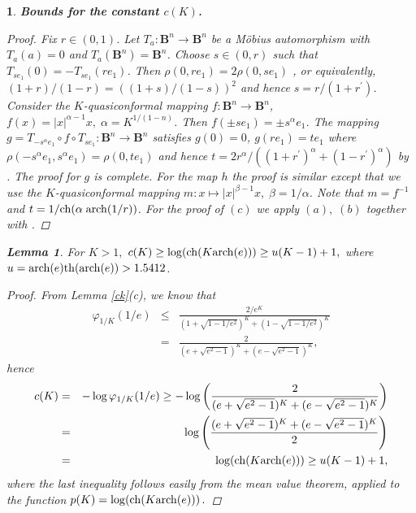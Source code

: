 \documentclass[12pt,a4paper,leqno]{amsart}
\theoremstyle{plain}
\newtheorem{lemma}[equation]{Lemma}
\newtheorem{subsec}[equation]{}
\numberwithin{equation}{section}          %
\begin{document}
\begin{subsec}{\bf Bounds for the constant $c(K)$.}
\begin{proof} Fix $r\in(0,1)$. Let $T_a:\mathbf{B}^n\to \mathbf{B}^n$ be a
M\"obius automorphism with $T_a(a)=0$ and $T_a(\mathbf{B}^n)=\mathbf{B}^n$.
Choose $s\in(0,r)$ such that $T_{se_1}(0)=-T_{se_1}(re_1)$.
Then $\rho(0,re_1)=2\rho(0,se_1)$ \cite[(2.17)]{vuobook}, or equivalently, $(1+r)/(1-r)=((1+s)/(1-s))^2$
and hence $s=r/(1+r^{'})$. Consider the $K$-quasiconformal mapping $f:\mathbf{B}^n\to \mathbf{B}^n$,
$f(x)=|x|^{\alpha-1}x,\;\alpha=K^{1/(1-n)}$. Then $f(\pm se_1)=\pm s^\alpha e_1$. The mapping
$g=T_{-s^\alpha e_1}\circ f\circ T_{se_1}:\mathbf{B}^n\to \mathbf{B}^n$ satisfies
$g(0)=0$, $g(re_1)=te_1$ where $\rho(-s^\alpha e_1,s^\alpha e_1)=\rho(0,te_1)$ and hence
$t=2r^\alpha/((1+r^{'})^\alpha+(1-r^{'})^\alpha)$ by \cite[(2.17)]{vuobook}. The proof for $g$ is complete.
For the map $h$ the proof is similar except that we use the $K$-quasiconformal
mapping  $m:x \mapsto |x|^{\beta-1}x,\; \beta=1/\alpha$.
Note that $m=f^{-1}$ and $t=1/{\rm ch}(\alpha \;{\rm arch}(1/r))$.
For the proof of $(c)$ we apply $(a),\;(b)$ together with \cite[(3.4), p.64]{lv}.
\end{proof}

\begin{lemma} For $K>1,$ $c(K)\geq \log({\rm ch}(K {\rm arch}(e)))\geq u(K-1)+1,$ where\\
$u={\rm arch}(e){\rm th}({\rm arch}(e))>1.5412$.
\end{lemma}
\begin{proof} From Lemma \ref{ck}(c), we know that
\begin{eqnarray*}
\varphi_{1/K}(1/e)&\leq&\frac{2/e^K}{(1+\sqrt{1-1/e^2})^K+(1-\sqrt{1-1/e^2})^K}\\
                  &=&\frac{2}{(e+\sqrt{e^2-1})^K+(e-\sqrt{e^2-1})^K},
\end{eqnarray*}
hence
\begin{eqnarray*}
c(K)&=&-\log\varphi_{1/K}(1/e)\geq -\log\left(\frac{2}{(e+\sqrt{e^2-1})^K+(e-\sqrt{e^2-1})^K}\right)\\
    &=&\log\left(\frac{(e+\sqrt{e^2-1})^K+(e-\sqrt{e^2-1})^K}{2}\right)\\
    &=&\log({\rm ch}(K {\rm arch}(e)))\geq u(K-1)+1,
\end{eqnarray*}
where the last inequality follows easily from the mean value theorem, applied to
the function $p(K)= \log({\rm ch}(K {\rm arch}(e)))\,.$
\end{proof}
\end{subsec}
\end{document}
